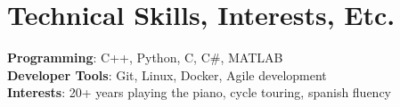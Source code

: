 \documentclass[letterpaper,10pt]{article}
\begin{document}
\section{Technical Skills, Interests, Etc.}
 \begin{itemize}[leftmargin=0.15in, label={}]
    \small{\item{
    \textbf{Programming}{: C++, Python, C, C\#, MATLAB} \\
    \textbf{Developer Tools}{: Git, Linux, Docker, Agile development}\\
    \textbf{Interests}{: 20+ years playing the piano, cycle touring, spanish fluency}     
    }}
 \end{itemize}
\end{document}
